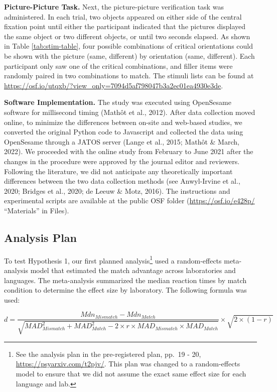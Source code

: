 \documentclass[
  man,mask,floatsintext]{apa7}
\begin{document}
\textbf{Picture-Picture Task.} Next, the picture-picture verification task
was administered. In each trial, two objects appeared on either side of
the central fixation point until either the participant indicated that
the pictures displayed the same object or two different objects, or
until two seconds elapsed. As shown in Table \ref{tab:stim-table}, four
possible combinations of critical orientations could be shown with the
picture (same, different) by orientation (same, different). Each
participant only saw one of the critical combinations, and filler items
were randomly paired in two combinations to match. The stimuli lists can
be found at \url{https://osf.io/utqxb/?view_only=7094d5af798047b3a2ec01ea4930e3de}.

\textbf{Software Implementation.} The study was executed using OpenSesame
software for millisecond timing
(Mathôt et al., 2012). After data collection moved
online, to minimize the differences between on-site and web-based
studies, we converted the original Python code to Javascript and
collected the data using OpenSesame through a JATOS server
(Lange et al., 2015; Mathôt \& March, 2022). We proceeded with
the online study from February to June 2021 after the changes in the
procedure were approved by the journal editor and reviewers. Following
the literature, we did not anticipate any theoretically important
differences between the two data collection methods (see Anwyl-Irvine et al., 2020; Bridges et al., 2020; de Leeuw \& Motz, 2016). The instructions and experimental
scripts are available at the public OSF folder (\url{https://osf.io/e428p/}
``Materials'' in Files).

\hypertarget{analysis-plan}{%
\subsection{Analysis Plan}\label{analysis-plan}}

To test Hypothesis 1, our first planned analysis\footnote{See the analysis plan in the pre-registered plan, pp.~19 - 20,
  \url{https://psyarxiv.com/t2pjv/}. This plan was changed to a
  random-effects model to ensure that we did not assume the exact same
  effect size for each language and lab.} used a
random-effects meta-analysis model that estimated the match advantage
across laboratories and languages. The meta-analysis summarized the
median reaction times by match condition to determine the effect size by
laboratory. The following formula was used:

\[d = \frac{Mdn_{Mismatch} - Mdn_{Match}}{\sqrt{MAD_{Mismatch}^2 + MAD_{Match}^2-2\times r\times MAD_{Mismatch} \times MAD_{Match}}} \times \sqrt{2 \times (1-r)}\]
\end{document}
